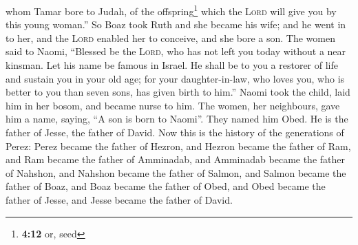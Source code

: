 whom Tamar bore to Judah, of the offspring\footnote{\textbf{4:12} or,
  seed} which the \textsc{Lord} will give you by this young woman.''
 So Boaz took Ruth and she became his wife; and he went
in to her, and the \textsc{Lord} enabled her to conceive, and she bore a
son.  The women said to Naomi, ``Blessed be the
\textsc{Lord}, who has not left you today without a near kinsman. Let
his name be famous in Israel.  He shall be to you a
restorer of life and sustain you in your old age; for your
daughter-in-law, who loves you, who is better to you than seven sons,
has given birth to him.''  Naomi took the child, laid him
in her bosom, and became nurse to him.  The women, her
neighbours, gave him a name, saying, ``A son is born to Naomi''. They
named him Obed. He is the father of Jesse, the father of David.
 Now this is the history of the generations of Perez:
Perez became the father of Hezron,  and Hezron became the
father of Ram, and Ram became the father of Amminadab, 
and Amminadab became the father of Nahshon, and Nahshon became the
father of Salmon,  and Salmon became the father of Boaz,
and Boaz became the father of Obed,  and Obed became the
father of Jesse, and Jesse became the father of David.

